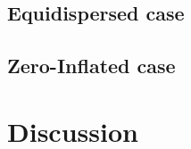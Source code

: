 \documentclass[9pt,a5paper,]{book}
\begin{document}
\section{Equidispersed case}\label{equidispersed-case}

\section{Zero-Inflated case}\label{zero-inflated-case}

\chapter{Discussion}\label{discussion}


\end{document}
